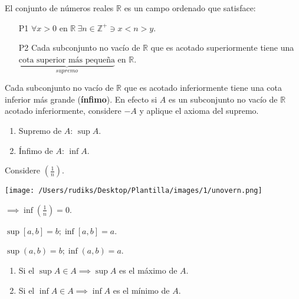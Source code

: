 \begin{definicion}
	El conjunto de números reales $\mathbb{R}$ es un campo ordenado que satisface: 
	\begin{enumerate}
		\item[P1] $\forall x>0$ en $\mathbb{R}\ \exists n \in \mathbb{Z}^+ \ni x<n>y$.
		\item[P2] Cada subconjunto no vacío de $\mathbb{R}$ que es acotado superiormente tiene una $\underbrace{\text{cota superior más pequeña}}_{supremo}$ en $\mathbb{R}$. 
	\end{enumerate}
\end{definicion}

\begin{nota}
	Cada subconjunto no vacío de $\mathbb{R}$ que es acotado inferiormente tiene una cota inferior más grande (\textbf{ínfimo}). En efecto si $A$ es un subconjunto no vacío de $\mathbb{R}$ acotado inferiormente, considere $-A$ y aplique el axioma del supremo.
	
	\begin{cajita}
		\begin{enumerate}
			\item Supremo de $A$: $\sup A$. 
			\item Ínfimo de $A$: $\inf A$.
				\end{enumerate}
	\end{cajita}
\end{nota}

\begin{ejemplo}
	\item Considere $\left(\frac{1}{n}\right)$. 
	\begin{center}
		\texttt{[image: /Users/rudiks/Desktop/Plantilla/images/1/unovern.png]}
	\end{center}
$\implies \inf\left(\frac{1}{n}\right)=0$. 
\end{ejemplo}

\begin{ejemplo}
\item $\sup[a,b]=b; \inf[a,b]=a$. 
\item $\sup (a,b)=b; \inf(a,b)=a$. 
\end{ejemplo}

\begin{nota}
	\begin{enumerate}
		\item Si el $\sup A\in A\implies \sup A$ es el máximo de $A$. 
		\item Si el $\inf A\in A\implies \inf A$ es el mínimo de $A$. 
	\end{enumerate}
\end{nota}

